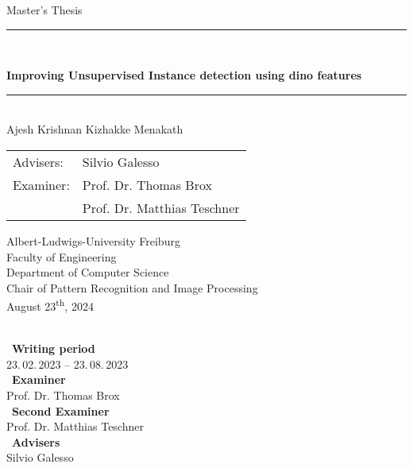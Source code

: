 
\begin{titlepage}
\begin{center}

\newcommand{\HorizontalLine}{\rule{\linewidth}{0.3mm}}

{\Large Master's Thesis}\\[1.3cm]


\HorizontalLine \\[0.4cm]
\begin{spacing}{2
}
    {\huge \bfseries Improving Unsupervised Instance detection using dino features} \\
\end{spacing}
\HorizontalLine \\[1.5cm]


{\Huge Ajesh Krishnan Kizhakke Menakath} \\[2cm]


\begin{tabular}[hc]{>{\huge}l >{\huge}l}
  
  Advisers: & Silvio Galesso \\[1.2cm]
  Examiner: & Prof. Dr. Thomas Brox \\[0.2cm]
    &          Prof. Dr. Matthias Teschner \\[0.3cm]
\end{tabular}
\vfill  %

\Large {
    Albert-Ludwigs-University Freiburg\\
    Faculty of Engineering\\
    Department of Computer Science\\
    Chair of Pattern Recognition and Image Processing\\[1cm]

    August 23\textsuperscript{th}, 2024\\
}
\end{center}
\end{titlepage}

\ \vfill \ \\  %
\
\textbf{Writing period}            \smallskip{} \\
23.\,02.\,2023 -- 23.\,08.\,2023   \bigskip{} \\
\
\textbf{Examiner}                  \smallskip{} \\
Prof. Dr. Thomas Brox              \bigskip{} \\
\
\textbf{Second Examiner}                  \smallskip{} \\
Prof. Dr. Matthias Teschner           \bigskip{} \\
\
\textbf{Advisers}                  \smallskip{} \\
Silvio Galesso
